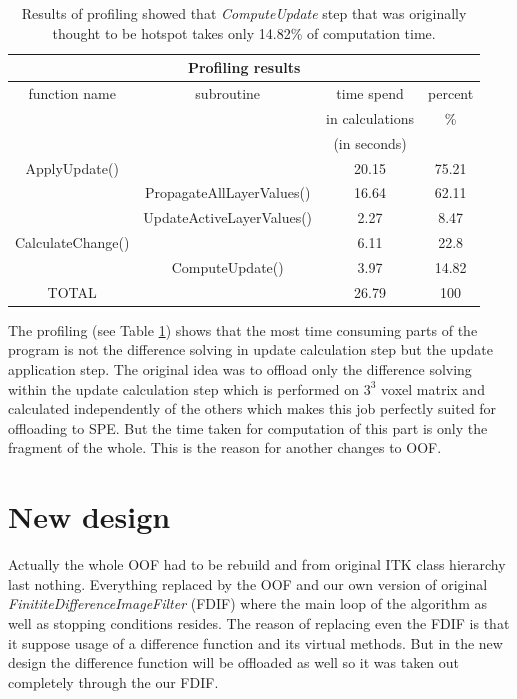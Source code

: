 \begin{table}
\centering
\begin{tabular}{|c|c|c|c|}
\hline
\multicolumn{4}{|c|}{Profiling results}\\
\hline
function name&subroutine&time spend&percent\\&&in calculations&\%\\&&(in seconds)&\\
\hline
\hline
ApplyUpdate()	&				&	20.15&	75.21\\
\hline
		&PropagateAllLayerValues()	&	16.64&	62.11\\
\hline
		&UpdateActiveLayerValues()	&	2.27&	8.47\\
\hline
CalculateChange()&				&	6.11&	22.8\\
\hline
		&ComputeUpdate()		&	3.97&	14.82\\
\hline
TOTAL		&				&	26.79&	100\\
\hline
\end{tabular}
\par
\caption[Profiling results]
{
  Results of profiling showed that \emph{ComputeUpdate} step that was originally thought to be hotspot takes only 14.82\% of computation time.
}
\label{tab:profilingresults}
\end{table}

\par
The profiling (see Table \ref{tab:profilingresults}) shows that the most time consuming parts of the program is not the difference solving in update calculation step but the update application step.
The original idea was to offload only the difference solving within the update calculation step which is performed on $3^3$ voxel matrix and calculated independently of the others which makes this job perfectly suited for offloading to SPE.
But the time taken for computation of this part is only the fragment of the whole.
This is the reason for another changes to OOF.

\section{New design}

\par
Actually the whole OOF had to be rebuild and from original ITK class hierarchy last nothing.
Everything replaced by the OOF and our own version of original \mbox{\emph{FinititeDifferenceImageFilter}} (FDIF) where the main loop of the algorithm as well as stopping conditions resides.
The reason of replacing even the FDIF is that it suppose usage of a difference function and its virtual methods.
But in the new design the difference function will be offloaded as well so it was taken out completely through the our FDIF.

